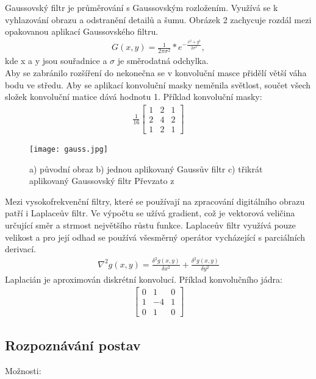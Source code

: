 \newpage
Gaussovský filtr je průměrování s Gaussovským rozložením. Využívá se k vyhlazování obrazu a odstranění detailů a šumu. Obrázek 2 zachycuje rozdál mezi opakovanou aplikací Gaussovského filtru.
\begin{eqnarray}
G(x,y) = \frac{1}{2 \pi \sigma^{2}}*e^{-\frac{x^{2}+y^{2}}{2\sigma^{2}}}  ,
\end{eqnarray}
kde x a y jsou souřadnice a $ \sigma $ je směrodatná odchylka.\\

Aby se zabránilo rozšíření do nekonečna se v konvoluční masce přidělí větší váha bodu ve středu. Aby se aplikací konvoluční masky neměnila světlost, součet všech složek konvoluční matice dává hodnotu 1. Příklad konvoluční masky:
\begin{eqnarray}
\frac{1}{16} \begin{bmatrix}
1 & 2 & 1 \\
2 & 4 & 2 \\
1 & 2 & 1
\end{bmatrix}
\end{eqnarray} 

\begin{figure}[h]
\centering
\texttt{[image: gauss.jpg]}
\caption{a) původní obraz b) jednou aplikovaný Gaussův filtr c) třikrát aplikovaný Gaussovský filtr
Převzato z ~\cite{15} }
\end{figure}

Mezi vysokofrekvenční filtry, které se používají na zpracování digitálního obrazu patří i Laplaceův filtr. Ve výpočtu se užívá gradient, což je vektorová veličina určující směr a strmost největšího růstu funkce. Laplaceův filtr využívá pouze velikost a pro její odhad se používá všesměrný operátor vycházející s parciálních derivací. %
\begin{eqnarray}
\nabla^{2}g(x,y) = \frac{\delta^{2}g(x,y)}{\delta x^{2}} + \frac{\delta^{2}g(x,y)}{\delta y^{2}}
\end{eqnarray} 
Laplacián je aproximován diskrétní konvolucí. Příklad konvolučního jádra:
\begin{eqnarray}
\begin{bmatrix}
0 & 1 & 0 \\
1 & -4 & 1 \\
0 & 1 & 0
\end{bmatrix}
\end{eqnarray} 


\subsection{Rozpoznávání postav}
Možnosti:

